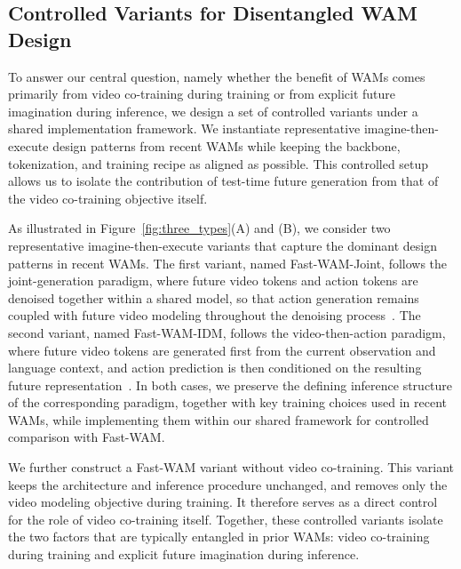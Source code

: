 \documentclass{article}
\begin{document}
\subsection{Controlled Variants for Disentangled WAM Design}
\label{sec:controlled_variants}

To answer our central question, namely whether the benefit of WAMs comes primarily from video co-training during training or from explicit future imagination during inference, we design a set of controlled variants under a shared implementation framework. We instantiate representative imagine-then-execute design patterns from recent WAMs while keeping the backbone, tokenization, and training recipe as aligned as possible. This controlled setup allows us to isolate the contribution of test-time future generation from that of the video co-training objective itself.

As illustrated in Figure~\ref{fig:three_types}(A) and (B), we consider two representative imagine-then-execute variants that capture the dominant design patterns in recent WAMs. The first variant, named Fast-WAM-Joint, follows the joint-generation paradigm, where future video tokens and action tokens are denoised together within a shared model, so that action generation remains coupled with future video modeling throughout the denoising process~\cite{ye2026worldactionmodelszeroshot, zhu2025unifiedworldmodelscoupling, bi2025motusunifiedlatentaction}. The second variant, named Fast-WAM-IDM, follows the video-then-action paradigm, where future video tokens are generated first from the current observation and language context, and action prediction is then conditioned on the resulting future representation~\cite{lingbot-va2026, feng2025vidarembodiedvideodiffusion, du2023learninguniversalpoliciestextguided}. In both cases, we preserve the defining inference structure of the corresponding paradigm, together with key training choices used in recent WAMs, while implementing them within our shared framework for controlled comparison with Fast-WAM.

We further construct a Fast-WAM variant without video co-training. This variant keeps the architecture and inference procedure unchanged, and removes only the video modeling objective during training. It therefore serves as a direct control for the role of video co-training itself. Together, these controlled variants isolate the two factors that are typically entangled in prior WAMs: video co-training during training and explicit future imagination during inference.
\end{document}

